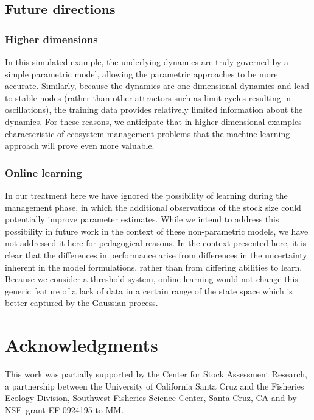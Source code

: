 \documentclass[author-year, review]{elsarticle} %
\begin{document}
\subsection{Future directions}

\subsubsection{Higher dimensions}

In this simulated example, the underlying dynamics are truly governed by
a simple parametric model, allowing the parametric approaches to be more
accurate. Similarly, because the dynamics are one-dimensional dynamics
and lead to stable nodes (rather than other attractors such as
limit-cycles resulting in oscillations), the training data provides
relatively limited information about the dynamics. For these reasons, we
anticipate that in higher-dimensional examples characteristic of
ecosystem management problems that the machine learning approach will
prove even more valuable.

\subsubsection{Online learning}

In our treatment here we have ignored the possibility of learning during
the management phase, in which the additional observations of the stock
size could potentially improve parameter estimates. While we intend to
address this possibility in future work in the context of these
non-parametric models, we have not addressed it here for pedagogical
reasons. In the context presented here, it is clear that the differences
in performance arise from differences in the uncertainty inherent in the
model formulations, rather than from differing abilities to learn.
Because we consider a threshold system, online learning would not change
this generic feature of a lack of data in a certain range of the state
space which is better captured by the Gaussian process.

\section{Acknowledgments}

This work was partially supported by the Center for Stock Assessment
Research, a partnership between the University of California Santa Cruz
and the Fisheries Ecology Division, Southwest Fisheries Science Center,
Santa Cruz, CA and by NSF~grant EF-0924195 to MM.
\end{document}
